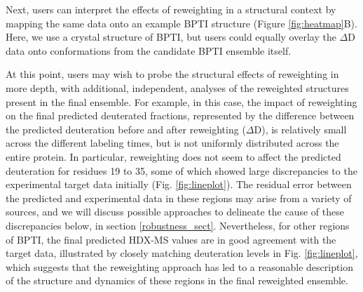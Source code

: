 \documentclass[9pt,tutorial]{livecoms}
\begin{document}
Next, users can interpret the effects of reweighting in a structural context by mapping the same data onto an example BPTI structure (Figure \ref{fig:heatmap}B).
Here, we use a crystal structure of BPTI, but users could equally overlay the $\Delta$D data onto conformations from the candidate BPTI ensemble itself.

At this point, users may wish to probe the structural effects of reweighting in more depth, with additional, independent, analyses of the reweighted structures present in the final ensemble. 
For example, in this case, the impact of reweighting on the final predicted deuterated fractions, represented by the difference between the predicted deuteration before and after reweighting ($\Delta$D), is relatively small across the different labeling times, but is not uniformly distributed across the entire protein. 
In particular, reweighting does not seem to affect the predicted deuteration for residues 19 to 35, some of which showed large discrepancies to the experimental target data initially (Fig. \ref{fig:lineplot}). 
The residual error between the predicted and experimental data in these regions may arise from a variety of sources, and we will discuss possible approaches to delineate the cause of these discrepancies below, in section \ref{robustness_sect}.
Nevertheless, for other regions of BPTI, the final predicted HDX-MS values are in good agreement with the target data, illustrated by closely matching deuteration levels in Fig. \ref{fig:lineplot}, which suggests that the reweighting approach has led to a reasonable description of the structure and dynamics of these regions in the final reweighted ensemble.
\end{document}
